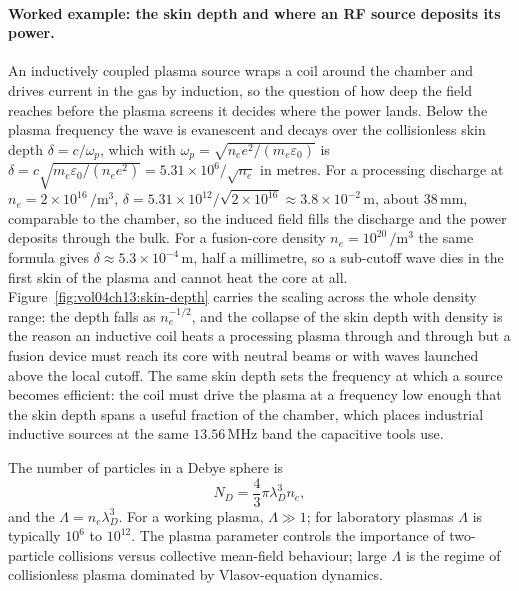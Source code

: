 

\paragraph{Worked example: the skin depth and where an RF source deposits its power.}
An inductively coupled plasma source wraps a coil around the chamber and drives
current in the gas by induction, so the question of how deep the field reaches
before the plasma screens it decides where the power lands. Below the plasma
frequency the wave is evanescent and decays over the collisionless skin depth
$\delta = c/\omega_p$, which with $\omega_p = \sqrt{n_e e^{2}/(m_e\varepsilon_0)}$
is $\delta = c\sqrt{m_e\varepsilon_0/(n_e e^{2})} = 5.31\times 10^{6}/\sqrt{n_e}$
in metres. For a processing discharge at $n_e = 2\times 10^{16}\,\si{\per\meter
\cubed}$, $\delta = 5.31\times 10^{12}/\sqrt{2\times 10^{16}} \approx 3.8\times
10^{-2}\,\si{\meter}$, about $38\,\si{\milli\meter}$, comparable to the chamber,
so the induced field fills the discharge and the power deposits through the bulk.
For a fusion-core density $n_e = 10^{20}\,\si{\per\meter\cubed}$ the same formula
gives $\delta \approx 5.3\times 10^{-4}\,\si{\meter}$, half a millimetre, so a
sub-cutoff wave dies in the first skin of the plasma and cannot heat the core at
all. Figure~\ref{fig:vol04ch13:skin-depth} carries the scaling across the whole
density range: the depth falls as $n_e^{-1/2}$, and the collapse of the skin
depth with density is the reason an inductive coil heats a processing plasma
through and through but a fusion device must reach its core with neutral beams or
with waves launched above the local cutoff. The same skin depth sets the
frequency at which a source becomes efficient: the coil must drive the plasma at
a frequency low enough that the skin depth spans a useful fraction of the
chamber, which places industrial inductive sources at the same $13.56\,\si{\mega
\hertz}$ band the capacitive tools use.

The number of particles in a Debye sphere is
\[
N_{D} = \frac{4}{3}\pi \lambda_{D}^{3} n_{e},
\]
and the  $\Lambda = n_{e}\lambda_{D}^{3}$.
For a working plasma, $\Lambda \gg 1$; for laboratory plasmas
$\Lambda$ is typically $10^{6}$ to $10^{12}$. The plasma parameter
controls the importance of two-particle collisions versus collective
mean-field behaviour; large $\Lambda$ is the regime of
collisionless plasma dominated by Vlasov-equation dynamics.

